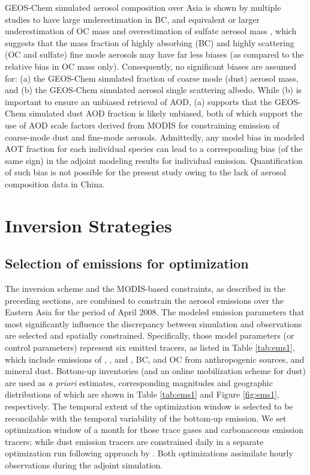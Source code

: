  GEOS-Chem simulated aerosol composition over Asia is shown by multiple studies 
 to have large underestimation in BC, and equivalent or larger underestimation 
 of OC mass and overestimation of sulfate aerosol mass \citep{heald05,fu12},
 which suggests that the mass fraction of highly absorbing (BC) 
 and highly scattering (OC and sulfate) fine mode aerosols may have far less biases 
 (as compared to the relative bias in OC mass only). 
 Consequently, no significant biases are assumed for: 
 (a) the GEOS-Chem simulated fraction of coarse mode (dust) aerosol mass, 
 and (b) the GEOS-Chem simulated aerosol single scattering albedo. 
 While (b) is important to ensure an unbiased retrieval of AOD, 
 (a) supports that the GEOS-Chem simulated dust AOD fraction is likely unbiased, 
 both of which support the use of AOD scale factors derived from MODIS 
 for constraining emission of coarse-mode dust and fine-mode aerosols. 
 Admittedly, any model bias in modeled AOT fraction for each individual species 
 can lead to a corresponding bias (of the same sign) in the adjoint modeling 
 results for individual emission. 
 Quantification of such bias is not possible for the present study 
 owing to the lack of aerosol composition data in China.

\section{Inversion Strategies} \label{sec:invstrategy}

\subsection{Selection of emissions for optimization} \label{sec:selectems}

 The inversion scheme and the MODIS-based constraints, as described in the preceding sections, 
 are combined to constrain the aerosol emissions over the Eastern Asia 
 for the period of April 2008. 
 The modeled emission parameters that most significantly influence the discrepancy 
 between simulation and observations are selected and spatially constrained. 
 Specifically, those model parameters (or control parameters) represent six emitted tracers, 
 as listed in Table \ref{tab:ems1}, which include emissions of , , and , BC, 
 and OC from anthropogenic sources, and mineral dust. 
 Bottom-up inventories (and an online mobilization scheme for dust) are used as 
 \textit{a priori} estimates, corresponding magnitudes and geographic distributions 
 of which are shown in Table \ref{tab:ems1} and Figure \ref{fig:ems1}, respectively. 
 The temporal extent of the optimization window is selected 
 to be reconcilable with the temporal variability of the bottom-up emission. 
 We set optimization window of a month for those trace gases and carbonaceous emission tracers; 
 while dust emission tracers are constrained daily in a separate optimization run 
 following approach by \citet{wang12}. 
 Both optimizations assimilate hourly observations during the adjoint simulation. 

